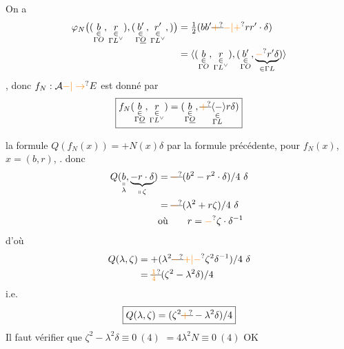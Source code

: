 On a
\[
\begin{aligned}\varphi_N\big((\underset{\substack{\in\\\Gamma O}}b,\underset{\substack{\in\\\Gamma L^\vee}}r),(\underset{\substack{\in\\\Gamma\underline O}}{b'},\underset{\substack{\in\\\Gamma L^\vee}}{r'},)\big)&=\tfrac12(bb'\deleted{\unsure{+}}\unsure{-|+}rr'\cdot\delta)\\ &=\langle(\underset{\substack{\in\\\Gamma O}}b,\underset{\substack{\in\\\Gamma L^\vee}}r),(\underset{\substack{\in\\\Gamma O}}{b'},\underbrace{\unsure{-}r'\delta}_{\in\Gamma L})\rangle\end{aligned}
\]
, donc
$f_N:\mathcal A\unsure{\mathbin{-}|\to}E$ est donné par
\[
\boxed{f_N(\underset{\substack{\in\\\Gamma\underline O}}b,\underset{\substack{\in\\\Gamma L^\vee}}r)=(\underset{\substack{\in\\\Gamma\underline O}}b,\underset{\substack{\in\\\Gamma L}}{\deleted{\unsure{+}}\inserted{-}r\delta})}
\]

  la formule $Q(f_N(x))=+N(x)\delta$ par la formule précédente, pour $f_N(x)$, $x=(b,r)$, .
 donc
\[
\begin{aligned}Q(\underset{\substack{\shortparallel\\\lambda}}{b},\underbrace{-r\cdot\delta}_{\shortparallel\,\zeta})&=\deleted{\unsure{-}}(b^2-r^2\cdot\delta)/4\ \delta\\ &=\deleted{\unsure{-}}(\lambda^2+r\zeta)/4\ \delta\\ &\text{où}\qquad r=\unsure{-}\zeta\cdot\delta^{-1}\end{aligned}
\]
d'où
\[
\begin{aligned}Q(\lambda,\zeta)&=+(\lambda^2\deleted{\unsure{-}}\unsure{+|-}\zeta^2\delta^{-1})/4\ \delta\\ &=\deleted{\unsure{\tfrac14}}(\zeta^2-\lambda^2\delta)/4\end{aligned}
\]
i.e.
\[
\boxed{Q(\lambda,\zeta)=(\zeta^2\deleted{\unsure{+}}-\lambda^2\delta)/4}
\]
Il faut vérifier que $\zeta^2-\lambda^2\delta\equiv0\ (4)$
$=4\lambda^2N\equiv0\ (4)$ OK 

